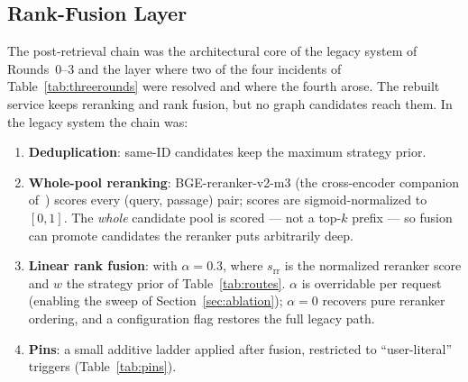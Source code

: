 \subsection{Rank-Fusion Layer}
\label{sec:fusionlayer}

The post-retrieval chain was the architectural core of the legacy system
of Rounds~0--3 and the layer where two of the four incidents of
Table~\ref{tab:threerounds} were resolved and where the fourth arose.
The rebuilt service keeps reranking and rank fusion, but no graph
candidates reach them. In the legacy system the chain was:

\begin{enumerate}
\item \textbf{Deduplication}: same-ID candidates keep the maximum
strategy prior.
\item \textbf{Whole-pool reranking}: BGE-reranker-v2-m3 (the
cross-encoder companion of~\cite{chen2024bgem3}) scores every
(query, passage) pair; scores are sigmoid-normalized to $[0,1]$. The
\emph{whole} candidate pool is scored --- not a top-$k$ prefix --- so
fusion can promote candidates the reranker puts arbitrarily deep.
\item \textbf{Linear rank fusion}: \fusedeq with $\alpha=0.3$, where
$s_{\mathrm{rr}}$ is the normalized reranker score and $w$ the strategy
prior of Table~\ref{tab:routes}. $\alpha$ is overridable per request
(enabling the sweep of Section~\ref{sec:ablation}); $\alpha=0$ recovers
pure reranker ordering, and a configuration flag restores the full
legacy path.
\item \textbf{Pins}: a small additive ladder applied after fusion,
restricted to ``user-literal'' triggers (Table~\ref{tab:pins}).
\end{enumerate}

